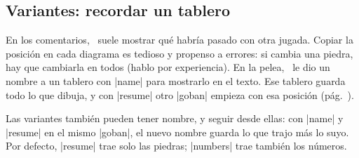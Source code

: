 \begin{goban}

\subsection{Variantes: recordar un tablero}
\label{tut:variantes}

En los comentarios, \karu\ suele mostrar qué habría pasado con otra jugada. Copiar la posición en cada diagrama es tedioso y propenso a errores: si cambia una piedra, hay que cambiarla en todos (hablo por experiencia). En la pelea, \karu\ le dio un nombre a un tablero con |name| para mostrarlo en el texto. Ese tablero guarda todo lo que dibuja, y con |resume| otro |goban| empieza con esa posición (pág.~\pageref{subsec:recordar}).

\begin{codeexample}[]

	\begin{goban}[name = base]
	\end{goban}

	\begin{goban}[resume = base]
	\end{goban}

	\begin{goban}[resume = base]
	\end{goban}
\end{codeexample}

Las variantes también pueden tener nombre, y seguir desde ellas: con |name| y |resume| en el mismo |goban|, el nuevo nombre guarda lo que trajo más lo suyo. Por defecto, |resume| trae solo las piedras; |numbers| trae también los números.

\begin{codeexample}[]

	\begin{goban}[name = base]
	\end{goban}

	\begin{goban}[name = variante, resume = base]
	\end{goban}

	\begin{goban}[resume = {variante, numbers}]
	\end{goban}
\end{codeexample}


\end{goban}
